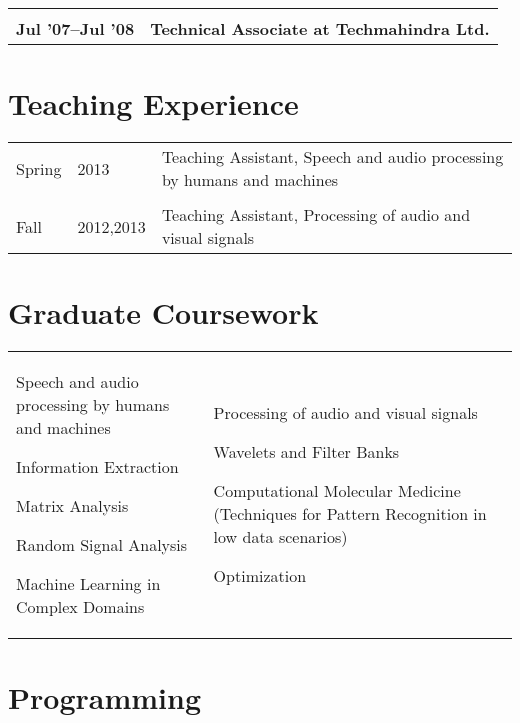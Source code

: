 \documentclass[margin,line,pifont,palatino,courier]{res}
\newenvironment{list1}{
  \begin{list}{\ding{113}}{%
      \setlength{\itemsep}{0in}
      \setlength{\parsep}{0in} \setlength{\parskip}{0in}
      \setlength{\topsep}{0in} \setlength{\partopsep}{0in}
      \setlength{\leftmargin}{0.17in}}}{\end{list}}
\begin{document}
\begin{resume}
\begin{longtable}{@{}p{1.2in}p{3.8in}}
&\\
\textbf{Jul '07--Jul '08} & \textbf{Technical Associate at Techmahindra Ltd.} \\
\end{longtable}

\section{\sc Teaching Experience}

\begin{tabular}{@{}p{0.4in}p{0.5in}p{4in}}
Spring & 2013 & Teaching Assistant, Speech and audio processing by humans and machines\\
\\
Fall & 2012,2013 & Teaching Assistant, Processing of audio and visual signals\\
\end{tabular}


\section{\sc Graduate Coursework}

\begin{tabular}{@{}p{2.3in}p{3in}}
\begin{list1}
\item Speech and audio processing by humans and machines
\item Information Extraction
\item Matrix Analysis
\item Random Signal Analysis
\item Machine Learning in Complex Domains


\end{list1}
&
\begin{list1}
\item Processing of audio and visual signals
\item Wavelets and Filter Banks
\item Computational Molecular Medicine (Techniques for Pattern Recognition in low data scenarios)
\item Optimization
\end{list1}

\end{tabular}


\section{\sc Programming}


\end{resume}
\end{document}
